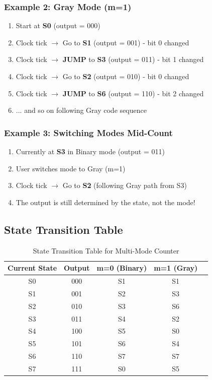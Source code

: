 \documentclass[12pt,a4paper]{article}
\begin{document}
\subsubsection{Example 2: Gray Mode (m=1)}
\begin{enumerate}
    \item Start at \textbf{S0} (output = 000)
    \item Clock tick $\rightarrow$ Go to \textbf{S1} (output = 001) - bit 0 changed
    \item Clock tick $\rightarrow$ \textbf{JUMP} to \textbf{S3} (output = 011) - bit 1 changed
    \item Clock tick $\rightarrow$ Go to \textbf{S2} (output = 010) - bit 0 changed
    \item Clock tick $\rightarrow$ \textbf{JUMP} to \textbf{S6} (output = 110) - bit 2 changed
    \item ... and so on following Gray code sequence
\end{enumerate}

\subsubsection{Example 3: Switching Modes Mid-Count}
\begin{enumerate}
    \item Currently at \textbf{S3} in Binary mode (output = 011)
    \item User switches mode to Gray (m=1)
    \item Clock tick $\rightarrow$ Go to \textbf{S2} (following Gray path from S3)
    \item The output is still determined by the state, not the mode!
\end{enumerate}

\subsection{State Transition Table}

\begin{table}[H]
    \centering
    \begin{tabular}{|c|c|c|c|c|}
        \hline
        \textbf{Current State} & \textbf{Output} & \textbf{m=0 (Binary)} & \textbf{m=1 (Gray)} \\
        \hline
        S0 & 000 & S1 & S1 \\
        S1 & 001 & S2 & S3 \\
        S2 & 010 & S3 & S6 \\
        S3 & 011 & S4 & S2 \\
        S4 & 100 & S5 & S0 \\
        S5 & 101 & S6 & S4 \\
        S6 & 110 & S7 & S7 \\
        S7 & 111 & S0 & S5 \\
        \hline
    \end{tabular}
    \caption{State Transition Table for Multi-Mode Counter}
\end{table}
\end{document}
